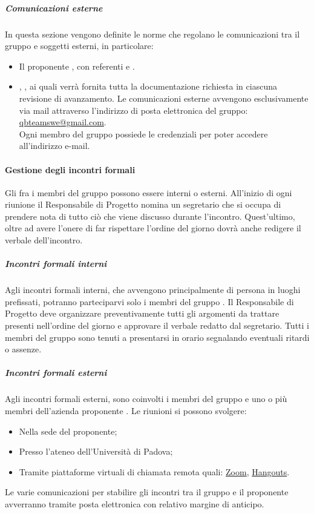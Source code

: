 \subparagraph*{Comunicazioni esterne}
In questa sezione vengono definite le norme che regolano le comunicazioni tra il gruppo e soggetti esterni, in particolare:
\begin{itemize}
	\item Il proponente \Proponente{}, con referenti \ZD{}{} e \CT{}.
	\item \VT{}, \CR{}, ai quali verrà fornita tutta la documentazione richiesta in ciascuna revisione di avanzamento.
	Le comunicazioni esterne avvengono esclusivamente via mail attraverso l’indirizzo di posta elettronica del gruppo:
	\url{qbteamswe@gmail.com}. \\
	Ogni membro del gruppo possiede le credenziali per poter accedere all’indirizzo e-mail.
\end{itemize}

\paragraph{Gestione degli incontri formali}
Gli  fra i membri del gruppo possono essere interni o esterni.
All’inizio di ogni riunione il Responsabile di Progetto nomina un segretario che si occupa di prendere nota di tutto ciò che viene discusso durante l’incontro.
Quest’ultimo, oltre ad avere l’onere di far rispettare l’ordine del giorno dovrà anche redigere il verbale dell’incontro.

\subparagraph*{Incontri formali interni}
Agli incontri formali interni, che avvengono principalmente di persona in luoghi prefissati, potranno parteciparvi solo i membri del gruppo \Gruppo{}.
Il Responsabile di Progetto deve organizzare preventivamente tutti gli argomenti da trattare presenti nell’ordine del giorno e approvare il verbale redatto dal segretario.
Tutti i membri del gruppo sono tenuti a presentarsi in orario segnalando eventuali ritardi o assenze.

\subparagraph*{Incontri formali esterni}
Agli incontri formali esterni, sono coinvolti i membri del gruppo \Gruppo{} e uno o più membri dell'azienda proponente \Proponente{}.
Le riunioni si possono svolgere:
\begin{itemize}
	\item Nella sede del proponente;
	\item Presso l’ateneo dell’Università di Padova;
	\item Tramite piattaforme virtuali di chiamata remota quali: \href{https://zoom.us/}{Zoom}, \href{https://hangouts.google.com/}{Hangouts}.
\end{itemize}
Le varie comunicazioni per stabilire gli incontri tra il gruppo e il proponente avverranno tramite posta elettronica con relativo margine di anticipo.

